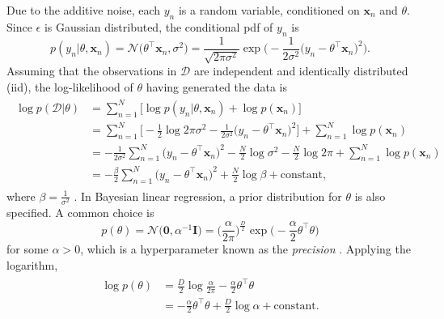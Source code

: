 \documentclass[msc,deptreport.inf]{infthesis} %
\newcommand{\matr}[1]{\mathbf{#1}}
\begin{document}
Due to the additive noise, each $y_n$ is a random variable, conditioned on $\matr{x}_n$ and $\theta$. Since $\epsilon$ is Gaussian distributed, the conditional pdf of $y_n$ is 
\begin{equation}\label{eqn:linear_regression_pdf}
	p(y_n | \theta, \matr{x}_n) 
	= \mathcal{N}\big(\theta^\intercal \matr{x}_n, \sigma^2\big)
	= \frac{1}{\sqrt{2\pi \sigma^2}} \exp\Big(-\frac{1}{2\sigma^2} \big(y_n - \theta^\intercal \matr{x}_n \big)^2\Big).
\end{equation}
Assuming that the observations in $\mathcal{D}$ are independent and identically distributed (iid), the log-likelihood of $\theta$ having generated the data is 
\begin{align}\label{eqn:linear_regression_log_likelihood}
\begin{split}
	\log p(\mathcal{D} | \theta) 
	& = \sum_{n=1}^N \big[ \log p(y_n | \theta, \matr{x}_n)  + \log p(\matr{x}_n) \big] \\
	& = \sum_{n=1}^N \Big[ -\frac{1}{2} \log 2\pi \sigma^2 - \frac{1}{2\sigma^2} \big(y_n - \theta^\intercal \matr{x}_n \big)^2 \Big]
	+ \sum_{n=1}^N \log p(\matr{x}_n) \\
	& = - \frac{1}{2 \sigma^2} \sum_{n=1}^N \big(y_n - \theta^\intercal \matr{x}_n \big)^2 
	- \frac{N}{2} \log \sigma^2
	- \frac{N}{2} \log 2\pi
	+ \sum_{n=1}^N \log p(\matr{x}_n) \\
	& = - \frac{\beta}{2} \sum_{n=1}^N \big(y_n - \theta^\intercal \matr{x}_n \big)^2 
	+ \frac{N}{2} \log \beta
	+ \text{constant},
\end{split}
\end{align}
where $\beta = \frac{1}{\sigma^2}$ \cite{barber2007}. In Bayesian linear regression, a prior distribution for $\theta$ is also specified. A common choice  is 
\begin{equation}\label{eqn:linear_regression_prior}
	p(\theta) 
	= \mathcal{N}\big(\matr{0}, \alpha^{-1} \matr{I} \big)
	= \Big(\frac{\alpha}{2\pi}\Big)^{\frac{D}{2}} \exp\Big(-\frac{\alpha}{2} \theta^\intercal \theta \Big)
\end{equation}
for some $\alpha > 0$, which is a hyperparameter known as the \emph{precision} \cite{barber2007}. Applying the logarithm, 
\begin{align}\label{eqn:linear_regression_log_prior}
\begin{split}
	\log p(\theta) 
	& = \frac{D}{2} \log \frac{\alpha}{2\pi} - \frac{\alpha}{2} \theta^\intercal \theta \\
	& = -\frac{\alpha}{2} \theta^\intercal \theta + \frac{D}{2} \log \alpha + \text{constant}.
\end{split}
\end{align}
\end{document}
